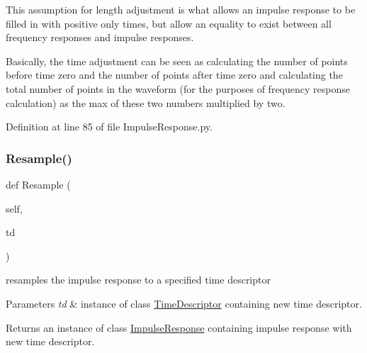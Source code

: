 This assumption for length adjustment is what allows an impulse response to be filled in with positive only times, but allow an equality to exist between all frequency responses and impulse responses.

Basically, the time adjustment can be seen as calculating the number of points before time zero and the number of points after time zero and calculating the total number of points in the waveform (for the purposes of frequency response calculation) as the max of these two numbers multiplied by two. 

Definition at line 85 of file Impulse\+Response.\+py.

\mbox{\label{classSignalIntegrity_1_1TimeDomain_1_1Waveform_1_1ImpulseResponse_1_1ImpulseResponse_adc3851330110033606ca742a0025ae1a}} 
\subsubsection{\texorpdfstring{Resample()}{Resample()}}
{\footnotesize\ttfamily def Resample (\begin{DoxyParamCaption}\item[{}]{self,  }\item[{}]{td }\end{DoxyParamCaption})}



resamples the impulse response to a specified time descriptor 


\begin{DoxyParams}{Parameters}
{\em td} & instance of class \hyperlink{namespaceSignalIntegrity_1_1TimeDomain_1_1Waveform_1_1TimeDescriptor}{Time\+Descriptor} containing new time descriptor. \\
\hline
\end{DoxyParams}
\begin{DoxyReturn}{Returns}
an instance of class \hyperlink{classSignalIntegrity_1_1TimeDomain_1_1Waveform_1_1ImpulseResponse_1_1ImpulseResponse}{Impulse\+Response} containing impulse response with new time descriptor. 
\end{DoxyReturn}


